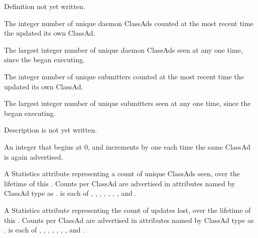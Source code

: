 \begin{description}
\item[\AdAttr{RunningJobs}:] Definition not yet written.

\item[\AdAttr{StartdAds}:] The integer number of unique 
  daemon ClassAds counted at the most recent time the 
  updated its own ClassAd.

\item[\AdAttr{StartdAdsPeak}:] The largest integer number of unique 
   daemon ClassAds seen at any one time, 
  since the  began executing.

\item[\AdAttr{SubmitterAds}:] The integer number of unique submitters 
  counted at the most recent time the  
  updated its own ClassAd.

\item[\AdAttr{SubmitterAdsPeak}:] The largest integer number of unique 
  submitters seen at any one time, 
since the  began executing.

\item[\AdAttr{UpdateInterval}:] Description is not yet written.

\item[\AdAttr{UpdateSequenceNumber}:] An integer that begins at 0,
   and increments by one each time the same ClassAd is again advertised.

\item[\AdAttr{UpdatesInitial}:] A Statistics attribute representing
  a count of unique ClassAds seen,
  over the lifetime of this .
  Counts per ClassAd are advertised in attributes named by ClassAd type
  as .
   is each of , ,
  , , , ,
  , and .

\item[\AdAttr{UpdatesLost}:] A Statistics attribute representing
  the count of updates lost,
  over the lifetime of this .
  Counts per ClassAd are advertised in attributes named by ClassAd type
  as .
   is each of , ,
  , , , ,
  , and .


\end{description}
